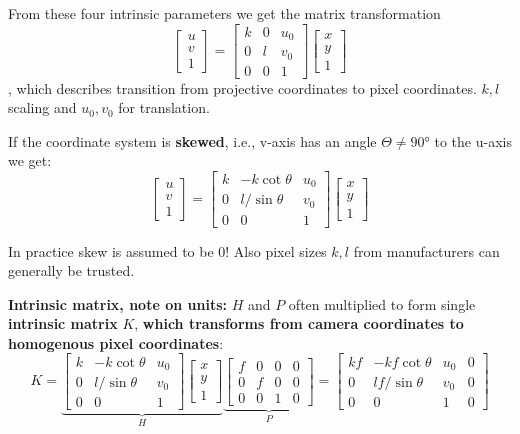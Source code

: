 From these four intrinsic parameters we get the matrix transformation $$\left[\begin{matrix}u \\ v \\ 1 \end{matrix} \right] = \left[\begin{matrix}k & 0 & u_0 \\ 0 & l & v_0 \\ 0 & 0 & 1 \end{matrix} \right]\left[\begin{matrix}x \\ y \\ 1 \end{matrix} \right]$$, which describes transition from projective coordinates to pixel coordinates. $k,l$ scaling and $u_0 , v_0$ for translation.

If the coordinate system is \textbf{skewed}, i.e., v-axis has an angle $\Theta \neq 90°$ to the u-axis we get:
$$\left[\begin{matrix}u \\ v \\ 1 \end{matrix} \right] = \left[\begin{matrix}k & -k \cot\theta & u_0 \\ 0 & l/\sin\theta & v_0 \\ 0 & 0 & 1 \end{matrix} \right]\left[\begin{matrix}x \\ y \\ 1 \end{matrix} \right]$$

In practice skew is assumed to be $0$! Also pixel sizes $k,l$ from manufacturers can generally be trusted.

\textbf{Intrinsic matrix, note on units:} $H$ and $P$ often multiplied to form single \textbf{intrinsic matrix} $K$, \textbf{which transforms from camera coordinates to homogenous pixel coordinates}:
$$K = \underset{H}{\underbrace{\left[\begin{matrix}k & -k \cot\theta & u_0 \\ 0 & l/\sin\theta & v_0 \\ 0 & 0 & 1 \end{matrix} \right]\left[\begin{matrix}x \\ y \\ 1 \end{matrix} \right]}} \underset{P}{\underbrace{\left[\begin{matrix} f & 0 & 0 & 0 \\ 0 & f & 0 & 0 \\ 0 & 0 & 1 & 0\end{matrix}\right]}} = \left[\begin{matrix}kf & -kf \cot\theta & u_0  & 0\\ 0 & lf/\sin\theta & v_0 & 0 \\ 0 & 0 & 1 & 0 \end{matrix} \right]$$


